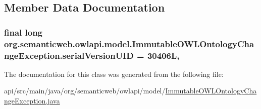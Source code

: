 \subsection{Member Data Documentation}
\hypertarget{classorg_1_1semanticweb_1_1owlapi_1_1model_1_1_immutable_o_w_l_ontology_change_exception_a669b651afd95bee3c65a84092309d5c2}{
\subsubsection[{serial\-Version\-U\-I\-D}]{\setlength{\rightskip}{0pt plus 5cm}final long org.\-semanticweb.\-owlapi.\-model.\-Immutable\-O\-W\-L\-Ontology\-Change\-Exception.\-serial\-Version\-U\-I\-D = 30406\-L\hspace{0.3cm}{\ttfamily [static]}, {\ttfamily [private]}}}\label{classorg_1_1semanticweb_1_1owlapi_1_1model_1_1_immutable_o_w_l_ontology_change_exception_a669b651afd95bee3c65a84092309d5c2}


The documentation for this class was generated from the following file\-:\begin{DoxyCompactItemize}
\item 
api/src/main/java/org/semanticweb/owlapi/model/\hyperlink{_immutable_o_w_l_ontology_change_exception_8java}{Immutable\-O\-W\-L\-Ontology\-Change\-Exception.\-java}\end{DoxyCompactItemize}
